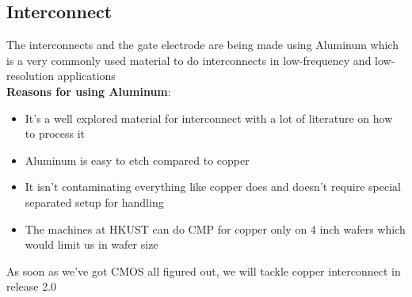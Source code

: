 \subsection{Interconnect}
The interconnects and the gate electrode are being made using Aluminum which is a very commonly used material to do interconnects in low-frequency and low-resolution applications \\

\textbf{Reasons for using Aluminum}:\begin{itemize}
\item It's a well explored material for interconnect with a lot of literature on how to process it
\item Aluminum is easy to etch compared to copper
\item It isn't contaminating everything like copper does and doesn't require special separated setup for handling
\item The machines at HKUST can do CMP for copper only on 4 inch wafers which would limit us in wafer size
\end{itemize}

\begin{mdframed}[linewidth=2pt,linecolor=green]
As soon as we've got CMOS all figured out, we will tackle copper interconnect in release 2.0
\end{mdframed}
